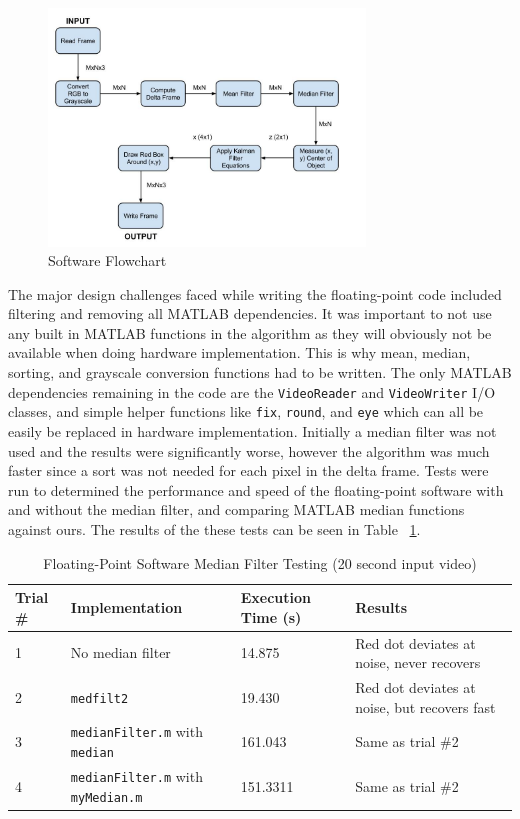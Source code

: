\documentclass[12pt]{article} %
\begin{document}
\begin{figure}[h]
\centering
\includegraphics[width=0.75\textwidth]{./images/software_flow.jpg}
\caption{Software Flowchart}
\label{fig:sw_flow}    
\end{figure}
\FloatBarrier
\noindent
The major design challenges faced while writing the floating-point code included filtering and removing all MATLAB dependencies. It was important to not use any built in MATLAB functions in the algorithm as they will obviously not be available when doing hardware implementation. This is why mean, median, sorting, and grayscale conversion functions had to be written. The only MATLAB dependencies remaining in the code are the \texttt{VideoReader} and \texttt{VideoWriter} I/O classes, and simple helper functions like \texttt{fix}, \texttt{round}, and \texttt{eye} which can all be easily be replaced in hardware implementation. Initially a median filter was not used and the results were significantly worse, however the algorithm was much faster since a sort was not needed for each pixel in the delta frame. Tests were run to determined the performance and speed of the floating-point software with and without the median filter, and comparing MATLAB median functions against ours. The results of the these tests can be seen in Table ~\ref{table:x}. 
\begin{table}[h]
\caption{Floating-Point Software Median Filter Testing (20 second input video)}
\label{table:x}
 \begin{tabular}{ | l | p{4cm} | l | p{5cm} |} \hline
Trial \# & Implementation & Execution Time (s) & Results \\ \hline
1 & No median filter & 14.875 & Red dot deviates at noise, never recovers  \\ \hline
2 & \texttt{medfilt2} & 19.430 & Red dot deviates at noise, but recovers fast \\ \hline
3 & \texttt{medianFilter.m} with \texttt{median} & 161.043 & Same as trial \#2 \\ \hline
4 & \texttt{medianFilter.m} with \texttt{myMedian.m} & 151.3311 & Same as trial \#2 \\ \hline
\end{tabular}
\end{table}
\end{document}
